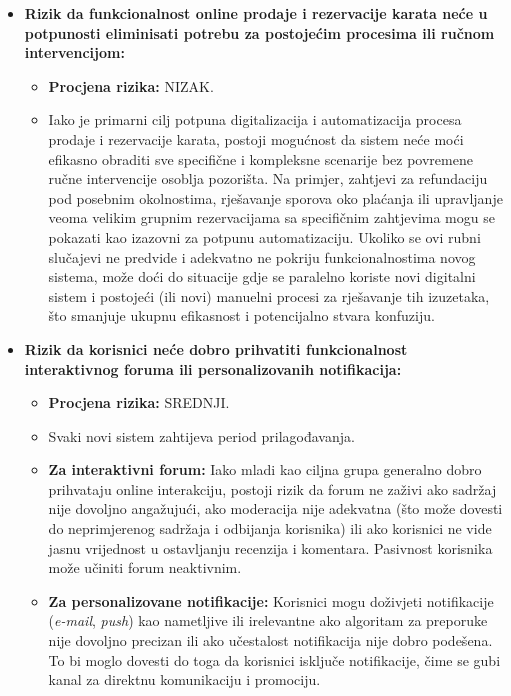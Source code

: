 \begin{itemize}
    \item \textbf{Rizik da funkcionalnost online prodaje i rezervacije karata neće u potpunosti eliminisati potrebu za postojećim procesima ili ručnom intervencijom:}

    \begin{itemize}
        \item \textbf{Procjena rizika:} NIZAK.
        
        \item Iako je primarni cilj potpuna digitalizacija i automatizacija procesa prodaje i rezervacije karata, postoji mogućnost da sistem neće moći efikasno obraditi sve specifične i kompleksne scenarije bez povremene ručne intervencije osoblja pozorišta. Na primjer, zahtjevi za refundaciju pod posebnim okolnostima, rješavanje sporova oko plaćanja ili upravljanje veoma velikim grupnim rezervacijama sa specifičnim zahtjevima mogu se pokazati kao izazovni za potpunu automatizaciju. Ukoliko se ovi rubni slučajevi ne predvide i adekvatno ne pokriju funkcionalnostima novog sistema, može doći do situacije gdje se paralelno koriste novi digitalni sistem i postojeći (ili novi) manuelni procesi za rješavanje tih izuzetaka, što smanjuje ukupnu efikasnost i potencijalno stvara konfuziju.
    \end{itemize}
    
    \item \textbf{Rizik da korisnici neće dobro prihvatiti funkcionalnost interaktivnog foruma ili personalizovanih notifikacija:}

    \begin{itemize}
        \item \textbf{Procjena rizika:} SREDNJI.
        
        \item Svaki novi sistem zahtijeva period prilagođavanja.
        
        \item \textbf{Za interaktivni forum:} Iako mladi kao ciljna grupa generalno dobro prihvataju online interakciju, postoji rizik da forum ne zaživi ako sadržaj nije dovoljno angažujući, ako moderacija nije adekvatna (što može dovesti do neprimjerenog sadržaja i odbijanja korisnika) ili ako korisnici ne vide jasnu vrijednost u ostavljanju recenzija i komentara. Pasivnost korisnika može učiniti forum neaktivnim.
        
        \item \textbf{Za personalizovane notifikacije:} Korisnici mogu doživjeti notifikacije (\textit{e-mail}, \textit{push}) kao nametljive ili irelevantne ako algoritam za preporuke nije dovoljno precizan ili ako učestalost notifikacija nije dobro podešena. To bi moglo dovesti do toga da korisnici isključe notifikacije, čime se gubi kanal za direktnu komunikaciju i promociju.
    \end{itemize}
    

\end{itemize}
